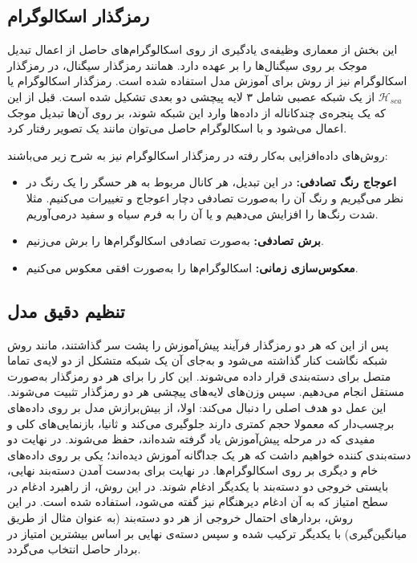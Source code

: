 \subsection{رمزگذار اسکالوگرام}

این بخش از معماری وظیفه‌ی یادگیری از روی اسکالوگرام‌های حاصل از اعمال تبدیل موجک بر روی سیگنال‌ها را بر عهده دارد. همانند رمزگذار سیگنال، در رمزگذار اسکالوگرام نیز از روش 
برای آموزش مدل استفاده شده است. رمزگذار اسکالوگرام یا
$\mathcal{H}_{sca}$
از یک شبکه عصبی شامل ۳ لایه پیچشی دو بعدی تشکیل شده است. قبل از این که یک پنجره‌ی چندکاناله از داده‌ها وارد این شبکه شوند، بر روی آن‌ها تبدیل موجک اعمال می‌شود و با اسکالوگرام حاصل می‌توان مانند یک تصویر رفتار کرد.

روش‌های داده‌افزایی به‌کار رفته در رمزگذار اسکالوگرام نیز به شرح زیر می‌باشند:
\begin{itemize}
    \item\textbf{اعوجاج رنگ تصادفی:}
    در این تبدیل، هر کانال مربوط به هر حسگر را یک رنگ در نظر می‌گیریم و رنگ آن را به‌صورت تصادفی دچار اعوجاج و تغییرات می‌کنیم. مثلا شدت رنگ‌ها را افزایش می‌دهیم و یا آن را به فرم سیاه و سفید درمی‌آوریم.
    \item\textbf{برش تصادفی:}
    به‌صورت تصادفی اسکالوگرام‌ها را برش می‌زنیم.
    \item\textbf{معکوس‌سازی زمانی:}
    اسکالوگرام‌ها را به‌صورت افقی معکوس می‌کنیم.
\end{itemize}

\subsection{تنظیم دقیق مدل}

پس از این که هر دو رمزگذار فرآیند پیش‌آموزش را پشت سر گذاشتند، مانند روش 
شبکه نگاشت کنار گذاشته می‌شود و به‌جای آن یک شبکه متشکل از دو لایه‌ی تماما متصل برای دسته‌بندی قرار داده می‌شوند. این کار را برای هر دو رمزگذار به‌صورت مستقل انجام می‌دهیم. سپس وزن‌های لایه‌های پیچشی هر دو رمزگذار تثبیت می‌شوند. این عمل دو هدف اصلی را دنبال می‌کند: اولا، از بیش‌برازش مدل بر روی داده‌های برچسب‌دار که معمولا حجم کمتری دارند جلوگیری می‌کند و ثانیا، بازنمایی‌های کلی و مفیدی که در مرحله پیش‌آموزش یاد گرفته شده‌اند، حفظ می‌شوند. در نهایت دو دسته‌بندی کننده خواهیم داشت که هر یک جداگانه آموزش دیده‌اند؛ یکی بر روی داده‌های خام و دیگری بر روی اسکالوگرام‌ها. در نهایت برای به‌دست آمدن دسته‌بند نهایی، بایستی خروجی دو دسته‌بند با یکدیگر ادغام شوند. در این روش، از راهبرد
ادغام در سطح امتیاز
که به آن
ادغام دیرهنگام
نیز گفته می‌شود، استفاده شده است. در این روش، بردارهای احتمال خروجی از هر دو دسته‌بند (به عنوان مثال از طریق میانگین‌گیری) با یکدیگر ترکیب شده و سپس دسته‌ی نهایی بر اساس بیشترین امتیاز در بردار حاصل انتخاب می‌گردد.

